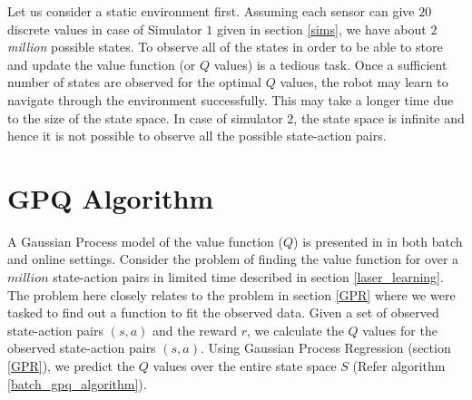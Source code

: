 \documentclass[12pt]{report}
\begin{document}
Let us consider a static environment first. Assuming each sensor can give $20$ discrete values in case of Simulator $1$ given in section \ref{sims}, we have about $2$ \textit{million} possible states. To observe all of the states in order to be able to store and update the value function (or $Q$ values) is a tedious task. Once a sufficient number of states are observed for the optimal $Q$ values, the robot may learn to navigate through the environment successfully. This may take a longer time due to the size of the state space. In case of simulator $2$, the state space is infinite and hence it is not possible to observe all the possible state-action pairs. 

\section{GPQ Algorithm}
 A Gaussian Process model of the value function ($Q$) is presented in \cite{chowdhary2014off} in both batch and online settings. Consider the problem of finding the value function for over a $million$ state-action pairs in limited time described in section \ref{laser_learning}. The problem here closely relates to the problem in section \ref{GPR} where we were tasked to find out a function to fit the observed data. Given a set of observed state-action pairs $(s,a)$ and the reward $r$, we calculate the $Q$ values for the observed state-action pairs $(s,a)$. Using Gaussian Process Regression (section \ref{GPR}), we predict the $Q$ values over the entire state space $S$ (Refer algorithm \ref{batch_gpq_algorithm}). 
 
\end{document}
